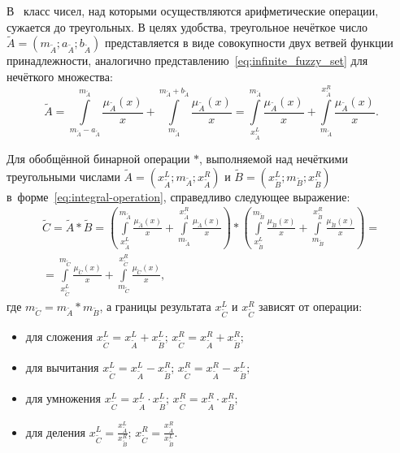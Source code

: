 В~\cite{Borisov_Krumberg_Riga} класс чисел, над которыми осуществляются арифметические операции, сужается до треугольных. В целях удобства, треугольное нечёткое число $\tilde{A}=\left( {{m}_{{\tilde{A}}}};{{a}_{{\tilde{A}}}};{{b}_{{\tilde{A}}}} \right)$ представляется в виде совокупности двух ветвей функции принадлежности, аналогично представлению~\eqref{eq:infinite_fuzzy_set} для нечёткого множества:
\begin{equation}
\label{eq:integral-operation}
	\tilde{A}=\int\limits_{{{m}_{{\tilde{A}}}}-{{a}_{{\tilde{A}}}}}^{{{m}_{{\tilde{A}}}}}{\frac{{{\mu }_{{\tilde{A}}}}\left( x \right)}{x}}+\int\limits_{{{m}_{{\tilde{A}}}}}^{{{m}_{{\tilde{A}}}}+{{b}_{{\tilde{A}}}}}{\frac{{{\mu }_{{\tilde{A}}}}\left( x \right)}{x}}=\int\limits_{x_{{\tilde{A}}}^{L}}^{{{m}_{{\tilde{A}}}}}{\frac{{{\mu }_{{\tilde{A}}}}\left( x \right)}{x}}+\int\limits_{{{m}_{{\tilde{A}}}}}^{x_{{\tilde{A}}}^{R}}{\frac{{{\mu }_{{\tilde{A}}}}\left( x \right)}{x}}.
\end{equation}

Для обобщённой бинарной операции $*$, выполняемой над нечёткими треугольными числами $\tilde{A}=\left( x_{{\tilde{A}}}^{L};{{m}_{{\tilde{A}}}};x_{{\tilde{A}}}^{R} \right)$ и $\tilde{B}=\left( x_{{\tilde{B}}}^{L};{{m}_{{\tilde{B}}}};x_{{\tilde{B}}}^{R} \right)$ в~форме~\eqref{eq:integral-operation}, справедливо следующее выражение:
\begin{gather*}
	\tilde{C}=\tilde{A}*\tilde{B}=\left( \int\limits_{x_{{\tilde{A}}}^{L}}^{{{m}_{{\tilde{A}}}}}{\frac{{{\mu }_{{\tilde{A}}}}\left( x \right)}{x}}+\int\limits_{{{m}_{{\tilde{A}}}}}^{x_{{\tilde{A}}}^{R}}{\frac{{{\mu }_{{\tilde{A}}}}\left( x \right)}{x}} \right)*\left( \int\limits_{x_{{\tilde{B}}}^{L}}^{{{m}_{{\tilde{B}}}}}{\frac{{{\mu }_{{\tilde{B}}}}\left( x \right)}{x}}+\int\limits_{{{m}_{{\tilde{B}}}}}^{x_{{\tilde{B}}}^{R}}{\frac{{{\mu }_{{\tilde{B}}}}\left( x \right)}{x}} \right)={}\\
	=\int\limits_{x_{{\tilde{C}}}^{L}}^{{{m}_{{\tilde{C}}}}}{\frac{{{\mu }_{{\tilde{C}}}}\left( x \right)}{x}}+\int\limits_{{{m}_{{\tilde{C}}}}}^{x_{{\tilde{C}}}^{R}}{\frac{{{\mu }_{{\tilde{C}}}}\left( x \right)}{x}},
\end{gather*}
где $m_{\tilde C}=m_{\tilde A}*m_{\tilde B}$, а границы результата $x_{\tilde C}^{L}$ и $x_{\tilde C}^{R}$ зависят от операции:
\begin{itemize}
	\item для сложения $x_{{\tilde{C}}}^{L}=x_{{\tilde{A}}}^{L}+x_{{\tilde{B}}}^{L}$; $x_{{\tilde{C}}}^{R}=x_{{\tilde{A}}}^{R}+x_{{\tilde{B}}}^{R}$;
	\item для вычитания $x_{{\tilde{C}}}^{L}=x_{{\tilde{A}}}^{L}-x_{{\tilde{B}}}^{R}$; $x_{{\tilde{C}}}^{R}=x_{{\tilde{A}}}^{R}-x_{{\tilde{B}}}^{L}$;
	\item для умножения $x_{{\tilde{C}}}^{L}=x_{{\tilde{A}}}^{L}\cdot x_{{\tilde{B}}}^{L}$; $x_{{\tilde{C}}}^{R}=x_{{\tilde{A}}}^{R}\cdot x_{{\tilde{B}}}^{R}$;
	\item для деления $\displaystyle x_{{\tilde{C}}}^{L}=\frac{x_{{\tilde{A}}}^{L}}{x_{{\tilde{B}}}^{R}}$; $\displaystyle x_{{\tilde{C}}}^{R}=\frac{x_{{\tilde{A}}}^{R}}{x_{{\tilde{B}}}^{L}}$.
\end{itemize}

